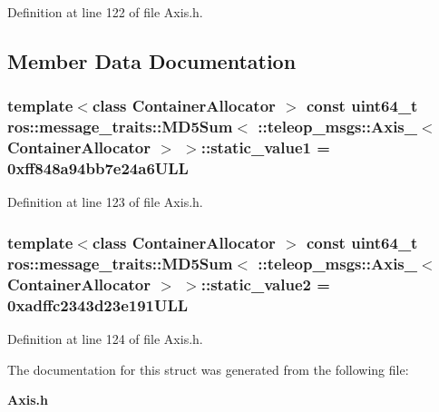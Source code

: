 Definition at line 122 of file Axis.h.



\subsection{Member Data Documentation}
\subsubsection[{static\_\-value1}]{\setlength{\rightskip}{0pt plus 5cm}template$<$class ContainerAllocator $>$ const uint64\_\-t ros::message\_\-traits::MD5Sum$<$ ::{\bf teleop\_\-msgs::Axis\_\-}$<$ ContainerAllocator $>$ $>$::{\bf static\_\-value1} = 0xff848a94bb7e24a6ULL\hspace{0.3cm}{\ttfamily  [static]}}\label{structros_1_1message__traits_1_1MD5Sum_3_01_1_1teleop__msgs_1_1Axis___3_01ContainerAllocator_01_4_01_4_a7cc6303c5e9e581a8c17b943c954e3af}


Definition at line 123 of file Axis.h.

\subsubsection[{static\_\-value2}]{\setlength{\rightskip}{0pt plus 5cm}template$<$class ContainerAllocator $>$ const uint64\_\-t ros::message\_\-traits::MD5Sum$<$ ::{\bf teleop\_\-msgs::Axis\_\-}$<$ ContainerAllocator $>$ $>$::{\bf static\_\-value2} = 0xadffc2343d23e191ULL\hspace{0.3cm}{\ttfamily  [static]}}\label{structros_1_1message__traits_1_1MD5Sum_3_01_1_1teleop__msgs_1_1Axis___3_01ContainerAllocator_01_4_01_4_a7d66e82e0c65cad60af323820d8bffd6}


Definition at line 124 of file Axis.h.



The documentation for this struct was generated from the following file:\begin{DoxyCompactItemize}
\item 
{\bf Axis.h}\end{DoxyCompactItemize}
